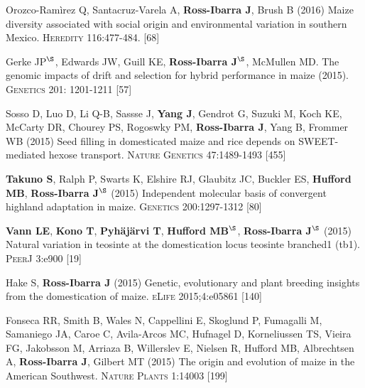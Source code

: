 \documentclass[letterpaper,10pt]{article}
\begin{document}
\begin{etaremune}
\item Orozco-Ram\`{i}rez Q, Santacruz-Varela A, {\bf Ross-Ibarra J}, Brush B (2016) Maize diversity associated with social origin and environmental variation in southern Mexico. \textsc{Heredity} 116:477-484.
 [68]\\


\item Gerke JP$^\S$, Edwards JW, Guill KE, {\bf Ross-Ibarra J}$^\S$, McMullen MD.  The genomic impacts of drift and selection for hybrid performance in maize (2015). \textsc{Genetics}  201: 1201-1211
 [57]\\


\item Sosso D, Luo D, Li Q-B, Sassse J, {\bf Yang J}, Gendrot G, Suzuki M, Koch KE, McCarty DR, Chourey PS, Rogoswky PM, {\bf Ross-Ibarra J}, Yang B, Frommer WB (2015) Seed filling in domesticated maize and rice depends on SWEET-mediated hexose transport. \textsc{Nature Genetics} 47:1489-1493
 [455]\\


\item {\bf Takuno S}, Ralph P, Swarts K, Elshire RJ, Glaubitz JC, Buckler ES, {\bf Hufford MB}, {\bf Ross-Ibarra J}$^\S$ (2015) Independent molecular basis of convergent highland adaptation in maize. \textsc{Genetics} 200:1297-1312
 [80]\\


\item {\bf Vann LE}, {\bf Kono T}, {\bf Pyh\"aj\"arvi T}, {\bf Hufford MB}$^\S$, {\bf Ross-Ibarra J}$^\S$ (2015) Natural variation in teosinte at the domestication locus teosinte branched1 (tb1). \textsc{PeerJ} 3:e900
 [19]\\


\item Hake S, {\bf Ross-Ibarra J} (2015) Genetic, evolutionary and plant breeding insights from the domestication of maize. \textsc{eLife}  2015;4:e05861
 [140]\\


\item Fonseca RR, Smith B, Wales N, Cappellini E, Skoglund P, Fumagalli M, Samaniego JA, Caroe C, Avila-Arcos MC, Hufnagel D, Korneliussen TS, Vieira FG, Jakobsson M, Arriaza B, Willerslev E, Nielsen R, Hufford MB, Albrechtsen A,  {\bf Ross-Ibarra J}, Gilbert MT (2015) The origin and evolution of maize in the American Southwest. \textsc{Nature Plants} 1:14003
 [199]\\


\end{etaremune}
\end{document}
